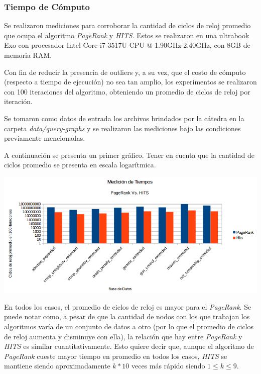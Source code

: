 \subsubsection{Tiempo de Cómputo}	
Se realizaron mediciones para corroborar la cantidad de ciclos de reloj promedio que ocupa el algoritmo \textit{PageRank} y \textit{HITS}. Estos se realizaron en una ultrabook Exo con procesador Intel Core i7-3517U CPU @ 1.90GHz-2.40GHz, con 8GB de memoria RAM.  
\par 
Con fin de reducir la presencia de outliers y, a su vez, que el costo de cómputo (respecto a tiempo de ejecución) no sea tan amplio, los experimentos se realizaron con 100 iteraciones del algoritmo, obteniendo un promedio de ciclos de reloj por iteración.
\par 
Se tomaron como datos de entrada los archivos brindados por la cátedra en la carpeta \textit{data/query-graphs} y se realizaron las mediciones bajo las condiciones previamente mencionadas.
\par 
A continuación se presenta un primer gráfico. Tener en cuenta que la cantidad de ciclos promedio se presenta en escala logarítmica. 

	\par 
	\begin{center}
		\includegraphics[scale=0.5]{./img/medicionesTiempo1.png}
	\end{center}
	
	\par 

En todos los casos, el promedio de ciclos de reloj es  mayor para el \textit{PageRank}. Se puede notar como, a pesar de que la cantidad de nodos con los que trabajan los algoritmos varía de un conjunto de datos a otro (por lo que el promedio de ciclos de reloj aumenta y disminuye con ella), la relación que hay entre \textit{PageRank} y \textit{HITS} es similar cuantitativamente. Esto quiere decir que, aunque el algoritmo de \textit{PageRank} cueste mayor tiempo en promedio en todos los casos, \textit{HITS} se mantiene siendo aproximadamente $k*10$ veces más rápido siendo $1 \leq k \leq 9$. 
\par 


